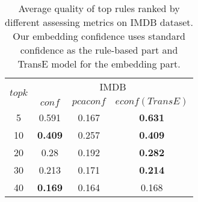 \begin{table}[tbh]
\scriptsize
\centering
\begin{tabular}{|c|c|c|c|} 
 \hline
 \multirow{2}{*}{$topk$} & \multicolumn{3}{|c|}{IMDB} \\
\cline{2-4}
 & $conf$ & $pcaconf$ & $econf(TransE)$ \\
 \hline
5 & 0.591 & 0.167 & \textbf{0.631} \\
10 & \textbf{0.409} & 0.257 & \textbf{0.409}\\
20 & 0.28 & 0.192 &\textbf{0.282} \\
30 & 0.213 & 0.171 & \textbf{0.214} \\
40 & \textbf{0.169} & 0.164 & 0.168 \\
 \hline
\end{tabular}
\newline
{}
\caption{Average quality of top rules ranked by different assessing metrics on IMDB dataset. Our embedding confidence uses standard confidence as the rule-based part and TransE model for the embedding part.}
\label{table:imdb_quality}
\end{table}
